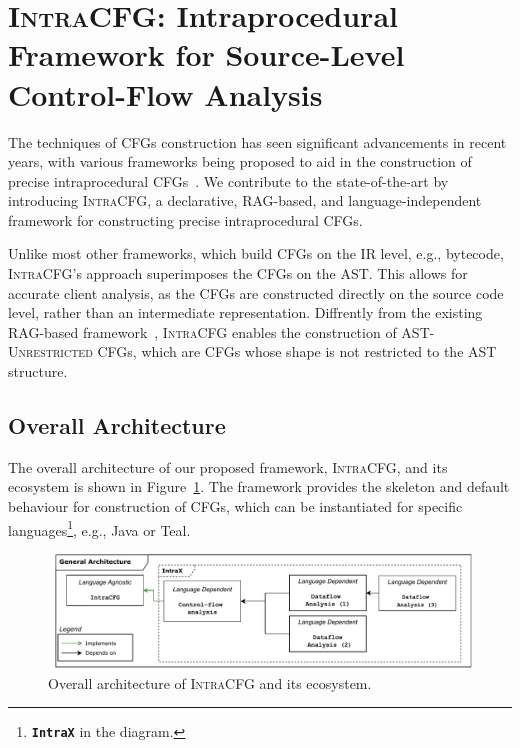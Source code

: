 \section{\textsc{IntraCFG}: Intraprocedural Framework for Source-Level Control-Flow Analysis}%
\label{sec:IntraCFG}
The techniques of CFGs construction has seen significant advancements
in recent years, with various frameworks being proposed to aid in the construction
of precise intraprocedural CFGs~\cite{smits2020flowspec,10.1016/j.scico.2012.02.002}.
We contribute to the state-of-the-art by introducing \textsc{IntraCFG}, a declarative, RAG-based,
and language-independent framework for constructing precise intraprocedural CFGs.

Unlike most other frameworks, which build CFGs on the IR level,
e.g.,  bytecode, \textsc{IntraCFG}'s approach superimposes the CFGs
on the AST. This allows for accurate client analysis,
as the CFGs are constructed directly on the source code level, rather than an
intermediate representation. 
Diffrently from the existing RAG-based framework~\cite{j.scico.2012.02.002}, 
\textsc{IntraCFG} enables the construction of \textsc{AST-Unrestricted} CFGs,
which are CFGs whose shape is not restricted to the AST structure.
\subsection{Overall Architecture}
The overall architecture of our proposed framework, \textsc{IntraCFG}, and its
ecosystem is shown in Figure~\ref{fig:intraCFG}.
The framework provides the skeleton and default behaviour for construction of CFGs,
which can be instantiated for specific languages\footnote{\textbf{\texttt{IntraX}} in the diagram.}, e.g., Java or Teal.
\begin{figure}[H]
    \centering
    \includegraphics[width=1\textwidth]{kappa/img/architecture.pdf}
    \caption{\label{fig:intraCFG} Overall architecture of \textsc{IntraCFG} and its ecosystem.}
\end{figure}


